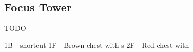 \subsection{Focus Tower}
\label{map:focus_tower}

TODO

1B - shortcut 
1F - Brown chest with s
2F - Red chest with 


